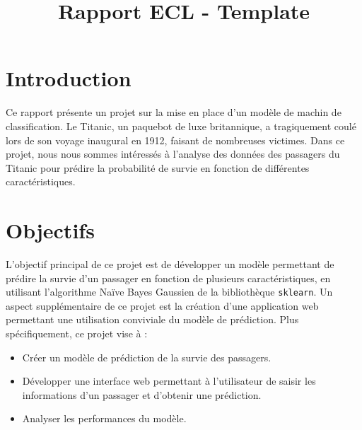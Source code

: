 \documentclass{rapportECL}
\title{Rapport ECL - Template} %
\begin{document}




        
\fairemarges %
\fairepagedegarde %
\tabledematieres %




\section{Introduction} 
Ce rapport présente un projet sur la mise en place d'un modèle de machin de classification. 
Le Titanic, un paquebot de luxe britannique, a tragiquement coulé lors de son voyage inaugural en 1912, faisant de nombreuses victimes. 
Dans ce projet, nous nous sommes intéressés à l'analyse des données des passagers du Titanic pour prédire la probabilité de 
survie en fonction de différentes caractéristiques.

\section{Objectifs}
L'objectif principal de ce projet est de développer un modèle permettant de prédire la survie d'un passager en fonction de plusieurs 
caractéristiques, en utilisant l'algorithme Naïve Bayes Gaussien de la bibliothèque \texttt{sklearn}. Un aspect supplémentaire de ce projet est la création d'une application web permettant une utilisation conviviale du modèle de prédiction. Plus spécifiquement, ce projet vise à :

\begin{itemize}
    \item Créer un modèle de prédiction de la survie des passagers.
    \item Développer une interface web permettant à l'utilisateur de saisir les informations d'un passager et d'obtenir une prédiction.
    \item Analyser les performances du modèle.
\end{itemize}
\end{document}
